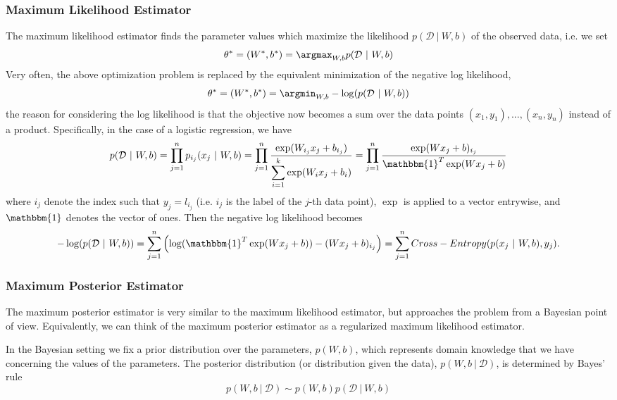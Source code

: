 \subsubsection{Maximum Likelihood Estimator}
The maximum likelihood estimator finds the parameter values which maximize the likelihood $p(\mathcal{D}~|~W, b)$ 
of the observed data, i.e. we set
\begin{equation}
 \theta^*=(W^*,b^*) = \argmax_{W, b} p(\mathcal{D}~|~W, b)
\end{equation}
Very often, the above optimization problem is replaced by the equivalent minimization of the negative log likelihood,
\begin{equation}
 \theta^*= (W^*,b^*) = \argmin_{W, b} -\log(p(\mathcal{D}~|~W, b))
\end{equation}
the reason for considering the log likelihood is that the objective now becomes a sum over the data points
$(x_1,y_1),...,(x_n,y_n)$ instead of a product. Specifically, in the case of a logistic regression, we have
\begin{equation}
 p(\mathcal{D}~|~W, b) = \prod_{j = 1}^n p_{i_j}(x_j ~|~W, b ) = 
\prod_{j = 1}^n 
\frac{\exp(W_{i_j}x_j + b_{i_j})}
{\displaystyle\sum_{i=1}^k\exp(W_{i}x_j + b_i)} = 
\displaystyle\prod_{j = 1}^n 
 \frac{\exp(W x_j + b)_{i_j}}
 {\mathbbm{1}^T\exp(W x_j + b)}
\end{equation}
where $i_j$ denote the index such that $y_j = l_{i_j}$ (i.e. $i_j$ is the label of the $j$-th data point), $\exp$ is applied
to a vector entrywise, and $\mathbbm{1}$ denotes the vector of ones. Then the negative log likelihood becomes
\begin{equation}
 -\log(p(\mathcal{D}~|~W, b)) = \displaystyle\sum_{j=1}^n \left(\log(\mathbbm{1}^T\exp(W x_j + b)) - 
 (W x_j + b)_{i_j}\right) = \sum_{j=1}^n Cross-Entropy(p(x_j ~|~ W,b), y_j).
\end{equation}


\subsubsection{Maximum Posterior Estimator}
The maximum posterior estimator is very similar to the maximum likelihood estimator, but approaches the problem from a 
Bayesian point of view. Equivalently, we can think of the maximum posterior estimator as a regularized maximum likelihood estimator.

In the Bayesian setting we fix a prior distribution over the parameters, $p(W,b)$, which represents domain
knowledge that we have concerning the values of the parameters. The posterior distribution (or distribution
given the data), $p(W,b~|~\mathcal{D})$, is determined by Bayes' rule
\begin{equation}
 p(W,b~|~\mathcal{D}) \sim p(W,b)p(\mathcal{D}~|~W,b)
\end{equation}

